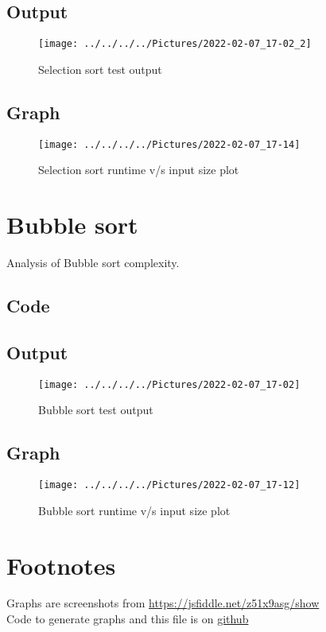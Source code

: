 \documentclass{article}
\begin{document}
    \subsection{Output}
    \begin{figure}[H]
        \centering
        \texttt{[image: ../../../../Pictures/2022-02-07\_17-02\_2]}
        \caption{Selection sort test output}
    \end{figure}

    \subsection{Graph}
    \begin{figure}[H]
        \centering
        \texttt{[image: ../../../../Pictures/2022-02-07\_17-14]}
        \caption{Selection sort runtime v/s input size plot}
    \end{figure}

    \section{Bubble sort}
    Analysis of Bubble sort complexity.
    \subsection{Code}
    

    \subsection{Output}
    \begin{figure}[H]
        \centering
        \texttt{[image: ../../../../Pictures/2022-02-07\_17-02]}
        \caption{Bubble sort test output}
    \end{figure}

    \subsection{Graph}
    \begin{figure}[H]
        \centering
        \texttt{[image: ../../../../Pictures/2022-02-07\_17-12]}
        \caption{Bubble sort runtime v/s input size plot}
    \end{figure}

    \section{Footnotes}
    Graphs are screenshots from \href{https://jsfiddle.net/z51x9asg/show}{https://jsfiddle.net/z51x9asg/show} \\
    Code to generate graphs and this file is on \href{https://github.com/pranavgade20/algos_complexity_benchmarker}{github}
\end{document}

